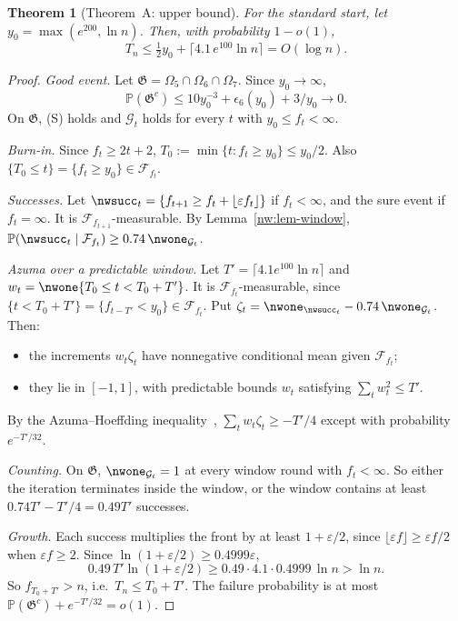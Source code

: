 \documentclass[11pt]{amsart}
\newtheorem{theorem}{Theorem}
\theoremstyle{definition}
\theoremstyle{remark}
\newcommand{\eps}{\varepsilon}
\newcommand{\PP}{\mathbb{P}}
\newcommand{\cF}{\mathcal{F}}
\begin{document}
\begin{theorem}[Theorem~A: upper bound]\label{nw:thm-A}
For the standard start, let $y_0=\max(e^{200},\ln n)$. Then, with probability
$1-o(1)$,
\[
  T_n\le\tfrac12y_0+\lceil4.1\,e^{100}\ln n\rceil=O(\log n).
\]
\end{theorem}

\begin{proof}
\emph{Good event.} Let $\mathfrak G=\Omega_5\cap\Omega_6\cap\Omega_7$. Since
$y_0\to\infty$,
\[
  \PP(\mathfrak G^c)\le10y_0^{-3}+\epsilon_6(y_0)+3/y_0\to0.
\]
On $\mathfrak G$, (S) holds and $\mathcal G_t$ holds for every $t$ with
$y_0\le f_t<\infty$.

\emph{Burn-in.} Since $f_t\ge2t+2$, $T_0:=\min\{t:f_t\ge y_0\}\le y_0/2$.
Also $\{T_0\le t\}=\{f_t\ge y_0\}\in\cF_{f_t}$.

\emph{Successes.} Let $\nwsucc_t=\{f_{t+1}\ge f_t+\lfloor\eps f_t\rfloor\}$
if $f_t<\infty$, and the sure event if $f_t=\infty$. It is
$\cF_{f_{t+1}}$-measurable. By Lemma~\ref{nw:lem-window},
$\PP(\nwsucc_t\mid\cF_{f_t})\ge0.74\,\nwone_{\mathcal G_t}$.

\emph{Azuma over a predictable window.} Let $T'=\lceil4.1e^{100}\ln n\rceil$
and $w_t=\nwone\{T_0\le t<T_0+T'\}$. It is $\cF_{f_t}$-measurable, since
$\{t<T_0+T'\}=\{f_{t-T'}<y_0\}\in\cF_{f_t}$. Put
$\zeta_t=\nwone_{\nwsucc_t}-0.74\,\nwone_{\mathcal G_t}$. Then:
\begin{itemize}[leftmargin=*]
\item the increments $w_t\zeta_t$ have nonnegative conditional mean given
  $\cF_{f_t}$;
\item they lie in $[-1,1]$, with predictable bounds $w_t$ satisfying
  $\sum_tw_t^2\le T'$.
\end{itemize}
By the Azuma--Hoeffding inequality~\cite{nw-azuma67,hoeffding,nw-freedman75},
$\sum_tw_t\zeta_t\ge-T'/4$ except with probability $e^{-T'/32}$.

\emph{Counting.} On $\mathfrak G$, $\nwone_{\mathcal G_t}=1$ at every window
round with $f_t<\infty$. So either the iteration terminates inside the
window, or the window contains at least $0.74T'-T'/4=0.49T'$ successes.

\emph{Growth.} Each success multiplies the front by at least $1+\eps/2$, since
$\lfloor\eps f\rfloor\ge\eps f/2$ when $\eps f\ge2$. Since
$\ln(1+\eps/2)\ge0.4999\eps$,
\[
  0.49\,T'\ln(1+\eps/2)\ge0.49\cdot4.1\cdot0.4999\,\ln n>\ln n.
\]
So $f_{T_0+T'}>n$, i.e.\ $T_n\le T_0+T'$. The failure probability is at most
$\PP(\mathfrak G^c)+e^{-T'/32}=o(1)$.
\end{proof}
\end{document}
